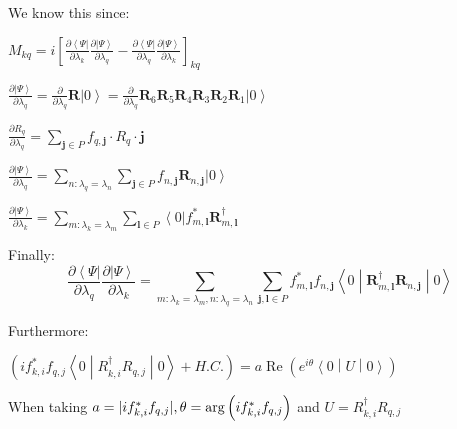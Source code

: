 \documentclass[professionalfonts]{beamer}
\newcommand{\bra}[1]{\ensuremath{\left\langle#1\right\vert}}
\newcommand{\ket}[1]{\ensuremath{\left|#1\right\rangle}}
\newcommand{\sandwich}[3]{\left< #1 \middle\vert #2 \middle\vert #3 \right>}
\newcommand{\paren}[1]{\left( #1 \right)}
\newcommand{\pd}[1]{\frac{\partial}{\partial #1}}
\newcommand{\kpp}[1]{\frac{\partial \ket\Psi}{\partial #1}}
\newcommand{\bpp}[1]{\frac{\partial \bra\Psi}{\partial #1}}
\DeclarePairedDelimiter\abs{\lvert}{\rvert}
\newcommand{\SubItem}[1]{
    {\setlength\itemindent{15pt} \item[*] #1}
}
\begin{document}
\begin{frame}
	\begin{itemize}
		\item We know this since: 
			\SubItem{$
				M_{kq} = i \left [ \bpp{\lambda_k} \kpp{\lambda_q}
					- \bpp{\lambda_q} \kpp{\lambda_k} \right ]_{kq}
			$}
			\SubItem{$
				\kpp {\lambda_q}
				=\pd {\lambda_q} \bm R \ket 0
				=\pd {\lambda_q} \bm R_6\bm R_5\bm R_4\bm R_3\bm R_2\bm R_1 \ket 0
			$}
			\SubItem{$
				\frac {\partial R_q}{\partial \lambda_q}
				= \sum_{\bm j \in P}
				f_{q, \bm j} \cdot R_q \cdot \bm j 
			$}
			\SubItem{$
				\kpp {\lambda_q}
				=\sum_{n: \lambda_q = \lambda_n} \sum_{\bm j \in P} f_{n, \bm j}\bm R_{n, \bm j} \ket 0
			$}
			\SubItem{$
				\kpp {\lambda_k}
				=\sum_{m: \lambda_k = \lambda_m} \sum_{\bm l \in P} \bra 0 f_{m, \bm l}^* \bm R_{m, \bm l}^\dagger
			$}
		\item {Finally:}
			$$
				\bpp {\lambda_q}\kpp {\lambda_k}
				=\sum_{m: \lambda_k = \lambda_m, n: \lambda_q = \lambda_n} 
				\sum_{\bm j, \bm l \in P} 
				f_{m, \bm l}^*f_{n, \bm j}
				\sandwich{0}{\bm R_{m, \bm l}^\dagger \bm R_{n, \bm j}}{0}
			$$
	\end{itemize}
\end{frame}

\begin{frame}
	\begin{itemize}
		\item Furthermore: 
			\SubItem{$\paren{if_{k, i}^*f_{q, j}\sandwich 0 {R_{k, i}^\dagger R_{q, j}} 0 + H.C.} 
			= a\operatorname{Re}\paren{e^{i\theta}\sandwich 0 U 0}$}
			When taking $a = \abs{if_{k, i}^*f_{q, j}}, \theta = \arg \paren{if_{k, i}^*f_{q, j}}$ and $U = {R_{k, i}^\dagger R_{q, j}}$
	\end{itemize}
\end{frame}
\end{document}
